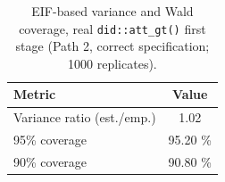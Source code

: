 \begin{table}[htbp]
\centering
\caption{EIF-based variance and Wald coverage, real \texttt{did::att\_gt()} first stage (Path 2, correct specification; 
1000
 replicates).}
\label{tab:eif-real}
\begin{tabular}{lc}
\toprule
Metric & Value \\
\midrule
Variance ratio (est./emp.) & 
1.02
 \\
95\% coverage & 
95.20
\% \\
90\% coverage & 
90.80
\% \\
\bottomrule
\end{tabular}
\end{table}
